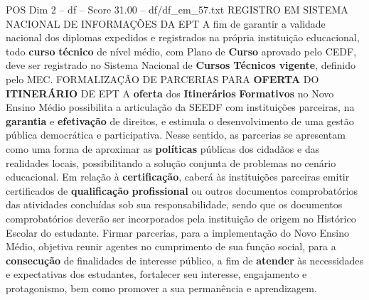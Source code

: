 \begin{textsample}{POS Dim 2 – df – Score 31.00 – df/df\_em\_57.txt}
REGISTRO EM SISTEMA NACIONAL DE INFORMAÇÕES DA EPT A fim de garantir a validade nacional dos diplomas expedidos e registrados na própria instituição educacional, todo \textbf{curso} \textbf{técnico} de nível médio, com Plano de \textbf{Curso} aprovado pelo CEDF, deve ser registrado no Sistema Nacional de \textbf{Cursos} \textbf{Técnicos} \textbf{vigente}, definido pelo MEC.
FORMALIZAÇÃO DE PARCERIAS PARA \textbf{OFERTA} DO \textbf{ITINERÁRIO} DE EPT A \textbf{oferta} dos \textbf{Itinerários} \textbf{Formativos} no Novo Ensino Médio possibilita a articulação da SEEDF com instituições parceiras, na \textbf{garantia} e \textbf{efetivação} de direitos, e estimula o desenvolvimento de uma gestão pública democrática e participativa.
Nesse sentido, as parcerias se apresentam como uma forma de aproximar as \textbf{políticas} públicas dos cidadãos e das realidades locais, possibilitando a solução conjunta de problemas no cenário educacional.
Em relação à \textbf{certificação}, caberá às instituições parceiras emitir certificados de \textbf{qualificação} \textbf{profissional} ou outros documentos comprobatórios das atividades concluídas sob sua responsabilidade, sendo que os documentos comprobatórios deverão ser incorporados pela instituição de origem no Histórico Escolar do estudante.
Firmar parcerias, para a implementação do Novo Ensino Médio, objetiva reunir agentes no cumprimento de sua função social, para a \textbf{consecução} de finalidades de interesse público, a fim de \textbf{atender} às necessidades e expectativas dos estudantes, fortalecer seu interesse, engajamento e protagonismo, bem como promover a sua permanência e aprendizagem.

\end{textsample}
